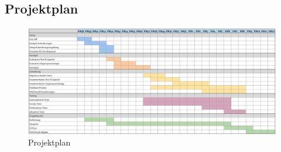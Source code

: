 \subsection*{Projektplan}

\begin{figure}[h]
    \centering
    \begin{minipage}[b]{\textwidth}
        \includegraphics[width=\textwidth]{graphics/projektplan}
        \caption{Projektplan}
    \end{minipage}\label{fig:projektplan}
\end{figure}

